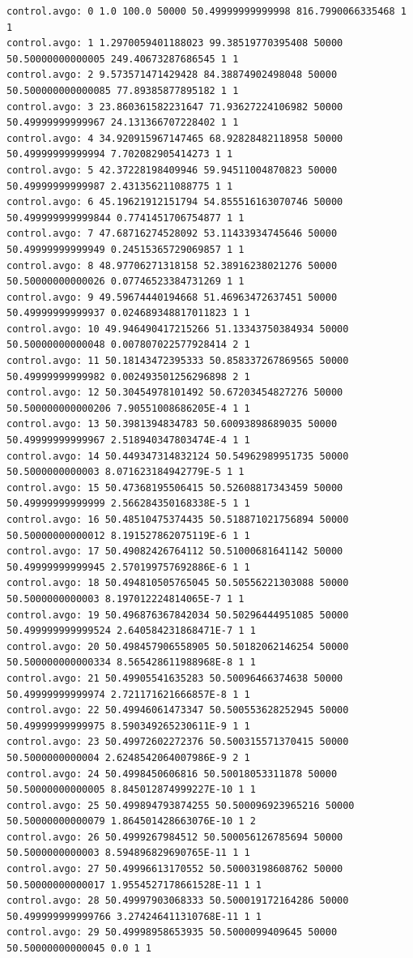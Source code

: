 \documentclass[a4paper,11pt]{article}
\begin{document}
\begin{verbatim}
control.avgo: 0 1.0 100.0 50000 50.49999999999998 816.7990066335468 1 1
control.avgo: 1 1.2970059401188023 99.38519770395408 50000 50.50000000000005 249.40673287686545 1 1
control.avgo: 2 9.573571471429428 84.38874902498048 50000 50.500000000000085 77.89385877895182 1 1
control.avgo: 3 23.860361582231647 71.93627224106982 50000 50.49999999999967 24.131366707228402 1 1
control.avgo: 4 34.920915967147465 68.92828482118958 50000 50.49999999999994 7.702082905414273 1 1
control.avgo: 5 42.37228198409946 59.94511004870823 50000 50.49999999999987 2.431356211088775 1 1
control.avgo: 6 45.19621912151794 54.855516163070746 50000 50.499999999999844 0.7741451706754877 1 1
control.avgo: 7 47.68716274528092 53.11433934745646 50000 50.49999999999949 0.24515365729069857 1 1
control.avgo: 8 48.97706271318158 52.38916238021276 50000 50.50000000000026 0.07746523384731269 1 1
control.avgo: 9 49.59674440194668 51.46963472637451 50000 50.49999999999937 0.024689348817011823 1 1
control.avgo: 10 49.946490417215266 51.13343750384934 50000 50.50000000000048 0.007807022577928414 2 1
control.avgo: 11 50.18143472395333 50.858337267869565 50000 50.49999999999982 0.002493501256296898 2 1
control.avgo: 12 50.30454978101492 50.67203454827276 50000 50.500000000000206 7.90551008686205E-4 1 1
control.avgo: 13 50.3981394834783 50.60093898689035 50000 50.49999999999967 2.518940347803474E-4 1 1
control.avgo: 14 50.449347314832124 50.54962989951735 50000 50.5000000000003 8.071623184942779E-5 1 1
control.avgo: 15 50.47368195506415 50.52608817343459 50000 50.49999999999999 2.566284350168338E-5 1 1
control.avgo: 16 50.48510475374435 50.518871021756894 50000 50.50000000000012 8.191527862075119E-6 1 1
control.avgo: 17 50.49082426764112 50.51000681641142 50000 50.49999999999945 2.570199757692886E-6 1 1
control.avgo: 18 50.494810505765045 50.50556221303088 50000 50.5000000000003 8.197012224814065E-7 1 1
control.avgo: 19 50.496876367842034 50.50296444951085 50000 50.499999999999524 2.640584231868471E-7 1 1
control.avgo: 20 50.498457906558905 50.50182062146254 50000 50.500000000000334 8.565428611988968E-8 1 1
control.avgo: 21 50.49905541635283 50.50096466374638 50000 50.49999999999974 2.721171621666857E-8 1 1
control.avgo: 22 50.49946061473347 50.500553628252945 50000 50.49999999999975 8.590349265230611E-9 1 1
control.avgo: 23 50.49972602272376 50.500315571370415 50000 50.5000000000004 2.6248542064007986E-9 2 1
control.avgo: 24 50.4998450606816 50.50018053311878 50000 50.50000000000005 8.845012874999227E-10 1 1
control.avgo: 25 50.499894793874255 50.500096923965216 50000 50.50000000000079 1.864501428663076E-10 1 2
control.avgo: 26 50.4999267984512 50.500056126785694 50000 50.5000000000003 8.594896829690765E-11 1 1
control.avgo: 27 50.49996613170552 50.50003198608762 50000 50.50000000000017 1.9554527178661528E-11 1 1
control.avgo: 28 50.49997903068333 50.500019172164286 50000 50.499999999999766 3.274246411310768E-11 1 1
control.avgo: 29 50.49998958653935 50.5000099409645 50000 50.50000000000045 0.0 1 1
\end{verbatim}
\normalsize
\end{document}
